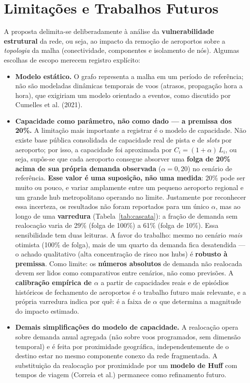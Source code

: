 \documentclass[12pt,a4paper]{article}
\begin{document}
\section{Limitações e Trabalhos Futuros}
\label{sec:limitacoes}

A proposta delimita-se deliberadamente à análise da \textbf{vulnerabilidade estrutural} da rede, ou
seja, ao impacto da remoção de aeroportos sobre a \textit{topologia} da malha (conectividade,
componentes e isolamento de nós). Algumas escolhas de escopo merecem registro explícito:

\begin{itemize}[leftmargin=*]
  \item \textbf{Modelo estático.} O grafo representa a malha em um período de referência; não são
        modeladas dinâmicas temporais de voos (atrasos, propagação hora a hora), que exigiriam um
        modelo orientado a eventos, como discutido por Cumelles et al. (2021).
  \item \textbf{Capacidade como parâmetro, não como dado --- a premissa dos 20\%.} A limitação
        mais importante a registrar é o modelo de capacidade. Não existe base pública consolidada
        de capacidade real de pista e de \textit{slots} por aeroporto; por isso, a capacidade foi
        aproximada por $C_i = (1 + \alpha)\,L_i$, ou seja, supôs-se que cada aeroporto consegue
        absorver uma \textbf{folga de 20\% acima de sua própria demanda observada}
        ($\alpha = 0{,}20$) no cenário de referência. \textbf{Esse valor é uma suposição, não uma
        medida}: 20\% pode ser muito ou pouco, e variar amplamente entre um pequeno aeroporto
        regional e um grande hub metropolitano operando no limite. Justamente por reconhecer essa
        incerteza, os resultados não foram reportados para um único $\alpha$, mas ao longo de uma
        \textbf{varredura} (Tabela~\ref{tab:cascata}): a fração de demanda sem realocação varia de
        29\% (folga de 100\%) a 61\% (folga de 10\%). Essa sensibilidade tem duas leituras. A
        favor do trabalho: mesmo no cenário \textit{mais} otimista (100\% de folga), mais de um
        quarto da demanda fica desatendida --- o achado qualitativo (alta concentração de risco
        nos hubs) é \textbf{robusto à premissa}. Como limite: os \textbf{números absolutos} de
        demanda não realocada devem ser lidos como comparativos entre cenários, não como
        previsões. A \textbf{calibração empírica de $\alpha$} a partir de capacidades reais e de
        episódios históricos de fechamento de aeroportos é o trabalho futuro mais relevante, e a
        própria varredura indica por quê: é a faixa de $\alpha$ que determina a magnitude do
        impacto estimado.
  \item \textbf{Demais simplificações do modelo de capacidade.} A realocação opera sobre demanda
        anual agregada (não sobre voos programados, sem dimensão temporal) e é feita por
        proximidade geográfica, independentemente de o destino estar no mesmo componente conexo da
        rede fragmentada. A substituição da realocação por proximidade por um \textbf{modelo de
        Huff} com tempos de viagem (Correia et al.) permanece como refinamento futuro.
\end{itemize}
\end{document}
